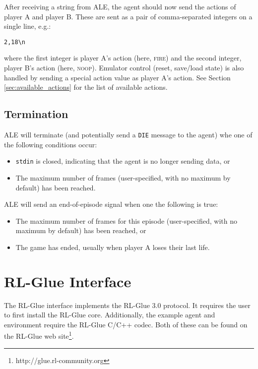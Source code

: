 \documentclass[12pt]{article}
\begin{document}
After receiving a string from ALE, the agent should now send the actions of player A and player B.
These are sent as a pair of comma-separated integers on a single line, e.g.:

\begin{verbatim}
2,18\n
\end{verbatim}

where the first integer is player A's action (here, \textsc{fire}) and the second integer, player B's action (here, \textsc{noop}). Emulator control (reset, save/load state) is also handled by sending a special action value as player A's action. See Section \ref{sec:available_actions} for the list of available actions.

\subsection{Termination}\label{subsec:termination_conditions}

ALE will terminate (and potentially send a \verb+DIE+ message to the agent) whe one of the following conditions occur:

\begin{itemize}
  \item{\texttt{stdin} is closed, indicating that the agent is no longer sending data, or}
  \item{The maximum number of frames (user-specified, with no maximum by default) has been reached.}
\end{itemize}

ALE will send an end-of-episode signal when one the following is true:

\begin{itemize}
  \item{The maximum number of frames for this episode (user-specified, with no maximum by default) has been reached, or}
  \item{The game has ended, usually when player A loses their last life.}
\end{itemize}

\section{RL-Glue Interface}\label{sec:rlglue_interface}

The RL-Glue interface implements the RL-Glue 3.0 protocol.
It requires the user to first install the RL-Glue core. Additionally, the example agent and 
environment require the RL-Glue C/C++ codec. Both of these can be found on the RL-Glue web
site\footnote{http://glue.rl-community.org}.
\end{document}

